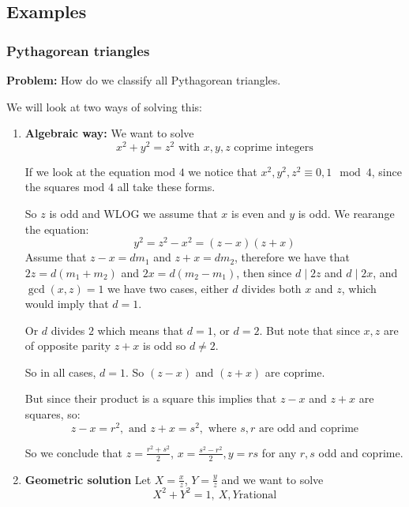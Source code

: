 \subsection{Examples}
\subsubsection{Pythagorean triangles}
\textbf{Problem:} How do we classify all Pythagorean triangles.

We will look at two ways of solving this:\begin{enumerate}
    \item \textbf{Algebraic way:} 
    We want to solve\begin{equation}
        x^2+y^2 = z^2 \text{ with }x,y,z\text{ coprime integers}
    \end{equation}
    
    If we look at the equation mod $4$ we notice that $x^2,y^2,z^2 \equiv 0,1 \mod 4$, since the squares mod $4$ all take these forms.
    
    So $z$ is odd and WLOG we assume that $x$ is even and $y$ is odd. 
    We rearange the equation:\begin{equation}
        y^2 = z^2-x^2 = (z-x)(z+x)
    \end{equation}
    Assume that $z-x = dm_1$ and $z+x = dm_2$, therefore we have that $2z = d(m_1+m_2)$ and $2x = d(m_2-m_1)$, then since $d\mid 2z$ and $d\mid 2x$, and $\gcd(x,z) = 1$ we have two cases, either $d$ divides both $x$ and $z$, which would imply that $d=1$.
    
    Or $d$ divides $2$ which means that $d = 1$, or $d=2$. But note that since $x,z$ are of opposite parity $z+x$ is odd so $d\neq 2$.
    
    So in all cases, $d = 1$. So $(z-x)$ and $(z+x)$ are coprime.
    
    But since their product is a square this implies that $z-x$ and $z+x$ are squares, so:\begin{equation}
        z-x = r^2, \text{ and }z+x = s^2, \text{ where }s,r\text{ are odd and coprime}
    \end{equation}
    
    So we conclude that $z = \frac{r^2+s^2}{2}$, $x = \frac{s^2-r^2}{2}, y=rs $ for any $r,s$ odd and coprime.
    
    \item \textbf{Geometric solution}
    Let $X = \frac{x}{z}$, $Y = \frac{y}{z}$ and we want to solve\begin{equation}
        X^2+Y^2=1, \ X,Y\text{rational}
    \end{equation}
    

\end{enumerate}
